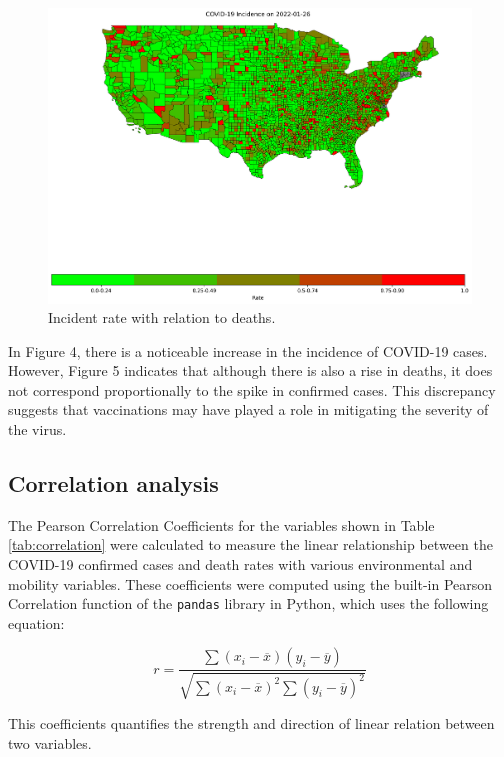 \documentclass[sigconf,screen,nonacm]{acmart}
\begin{document}
\begin{figure}[H]
  \centering
  \includegraphics[width=.8\linewidth]{Figures/IncidenceDeathRate_2022-01-26.png}
  \caption{Incident rate with relation to deaths.}
\end{figure}

In Figure 4, there is a noticeable increase in the incidence of COVID-19 cases. However, Figure 5 indicates that although there is also a rise in deaths, it does not correspond proportionally to the spike in confirmed cases. This discrepancy suggests that vaccinations may have played a role in mitigating the severity of the virus.

\noindent
\subsection{Correlation analysis}

The Pearson Correlation Coefficients for the variables shown in Table \ref{tab:correlation} were calculated to measure the linear relationship between the COVID-19 confirmed cases and death rates with various environmental and mobility variables. These coefficients were computed using the built-in Pearson Correlation function of the \texttt{pandas} library in Python, which uses the following equation:

\begin{equation}
r = \frac{\sum (x_i - \overline{x})(y_i - \overline{y})}{\sqrt{\sum (x_i - \overline{x})^2 \sum (y_i - \overline{y})^2}}
\end{equation}

This coefficients quantifies the strength and direction of linear relation between two variables.
\end{document}
